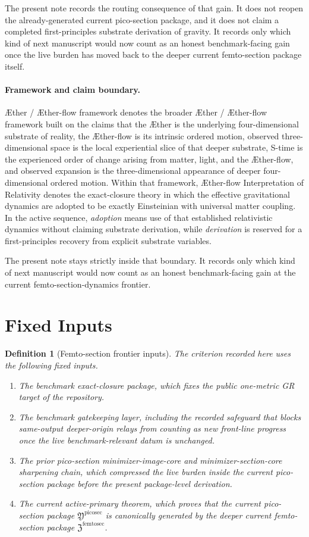 \documentclass[11pt]{article}
\newcommand{\Aether}{\AE{}ther}
\newcommand{\Aflow}{\AE{}ther-flow}
\newcommand{\TheoryName}{\Aflow{} Interpretation of Relativity}
\newcommand{\TheoryProgram}{\Aether{} / \Aflow{} framework}
\newcommand{\PicoSectionPackage}{\mathfrak Y^{\mathrm{picosec}}}
\newcommand{\FemtoSectionPackage}{\mathfrak Z^{\mathrm{femtosec}}}
\newtheorem{definition}{Definition}
\begin{document}
The present note records the routing consequence of that gain. It does not reopen the already-generated current pico-section package, and it does not claim a completed first-principles substrate derivation of gravity. It records only which kind of next manuscript would now count as an honest benchmark-facing gain once the live burden has moved back to the deeper current femto-section package itself.

\paragraph{Framework and claim boundary.}
\TheoryProgram{} denotes the broader \Aether{} / \Aflow{} framework built on the claims that the \Aether{} is the underlying four-dimensional substrate of reality, the \Aflow{} is its intrinsic ordered motion, observed three-dimensional space is the local experiential slice of that deeper substrate, S-time is the experienced order of change arising from matter, light, and the \Aflow{}, and observed expansion is the three-dimensional appearance of deeper four-dimensional ordered motion. Within that framework, \TheoryName{} denotes the exact-closure theory in which the effective gravitational dynamics are adopted to be exactly Einsteinian with universal matter coupling. In the active sequence, \emph{adoption} means use of that established relativistic dynamics without claiming substrate derivation, while \emph{derivation} is reserved for a first-principles recovery from explicit substrate variables.

The present note stays strictly inside that boundary. It records only which kind of next manuscript would now count as an honest benchmark-facing gain at the current femto-section-dynamics frontier.

\section{Fixed Inputs}

\begin{definition}[Femto-section frontier inputs]
The criterion recorded here uses the following fixed inputs.
\begin{enumerate}
    \item The benchmark exact-closure package, which fixes the public one-metric GR target of the repository.
    \item The benchmark gatekeeping layer, including the recorded safeguard that blocks same-output deeper-origin relays from counting as new front-line progress once the live benchmark-relevant datum is unchanged.
    \item The prior pico-section minimizer-image-core and minimizer-section-core sharpening chain, which compressed the live burden inside the current pico-section package before the present package-level derivation.
    \item The current active-primary theorem, which proves that the current pico-section package \(\PicoSectionPackage\) is canonically generated by the deeper current femto-section package \(\FemtoSectionPackage\).
\end{enumerate}
\end{definition}
\end{document}
